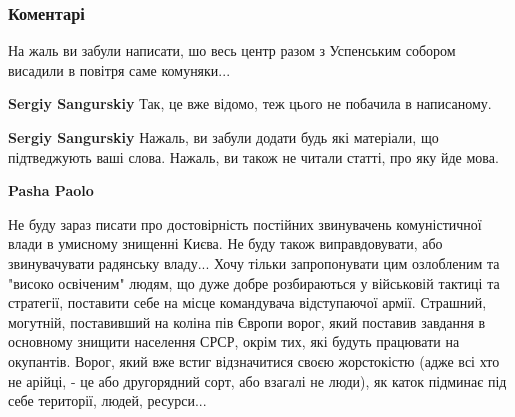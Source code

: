  
 
 
 
 
\subsubsection{Коментарі}

\begin{itemize}
 
На жаль ви забули написати, шо весь центр разом з Успенським собором висадили в повітря саме комуняки...

\begin{itemize}
 

\textbf{Sergiy Sangurskiy} Так, це вже відомо, теж цього не побачила в написаному.


 
\textbf{Sergiy Sangurskiy} Нажаль, ви забули додати будь які матеріали, що
підтведжують ваші слова. Нажаль, ви також не читали статті, про яку йде мова.

\begin{itemize}
 
\textbf{Pasha Paolo} 

Не буду зараз писати про достовірність постійних звинувачень комуністичної
влади в умисному знищенні Києва. Не буду також виправдовувати, або
звинувачувати радянську владу... Хочу тільки запропонувати цим озлобленим та
"високо освіченим" людям, що дуже добре розбираються у військовій тактиці та
стратегії, поставити себе на місце командувача відступаючої армії. Страшний,
могутній, поставивший на коліна пів Європи ворог, який поставив завдання в
основному знищити населення СРСР, окрім тих, які будуть працювати на окупантів.
Ворог, який вже встиг відзначитися своєю жорстокістю (адже всі хто не арійці, -
це або другорядний сорт, або взагалі не люди), як каток підминає під себе
території, людей, ресурси... 


\end{itemize}
\end{itemize}
\end{itemize}
